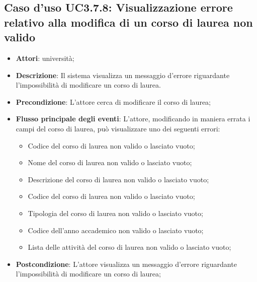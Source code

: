 \subsection{Caso d'uso \texorpdfstring{UC3.7.8}{UC3.7.8}: Visualizzazione errore relativo alla modifica di un corso di laurea non valido}
\begin{itemize}
\item \textbf{Attori}: università;
\item \textbf{Descrizione}: Il sistema visualizza un messaggio d'errore riguardante l'impossibilità di modificare un corso di laurea.

\item \textbf{Precondizione}: L'attore cerca di modificare il corso di laurea;

\item \textbf{Flusso principale degli eventi}: L'attore, modificando in maniera errata i campi del corso di laurea, può visualizzare uno dei seguenti errori: \begin{itemize} \item Codice del corso di laurea non valido o lasciato vuoto; \item Nome del corso di laurea non valido o lasciato vuoto; \item Descrizione del corso di laurea non valido o lasciato vuoto; \item Codice del corso di laurea non valido o lasciato vuoto; \item Tipologia del corso di laurea non valido o lasciato vuoto; \item Codice dell'anno accademico non valido o lasciato vuoto; \item Lista delle attività del corso di laurea non valido o lasciato vuoto; \end{itemize}
\item \textbf{Postcondizione}: L'attore visualizza un messaggio d'errore riguardante l'impossibilità di modificare un corso di laurea;


\end{itemize}
